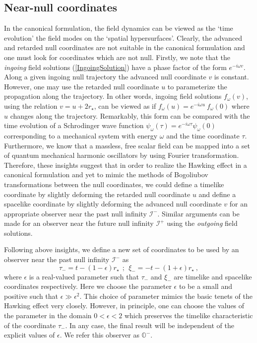 \documentclass[aps,12pt,showpacs]{revtex4-2}
\def\rstar{r_{\star}}
\def\scriplus{\mathscr{I}^{+}}
\def\scriminus{\mathscr{I}^{-}}
\def\observerminus{\mathbb{O}^{-}}
\begin{document}
\subsection{Near-null coordinates}


In the canonical formulation, the field dynamics can be viewed as the `time 
evolution' the field modes on the `spatial hypersurfaces'. Clearly, the advanced 
and retarded null coordinates are not suitable in the canonical formulation and 
one must look for coordinates which are not null. Firstly, we note that the 
\emph{ingoing} field solutions (\ref{IngoingSolution}) have a phase factor of 
the form $e^{-i\omega v}$. Along a given ingoing null trajectory the advanced 
null coordinate $v$ is constant. However, one may use the retarded null 
coordinate $u$ to parameterize the propagation along the trajectory. In other 
words, ingoing field solutions ${f}_{\omega}(v)$, using the relation 
$v=u+2\rstar$, can be viewed as if ${f}_{\omega}(u) = e^{-i\omega u } 
~{f}_{\omega}(0)$ where $u$ changes along the trajectory. Remarkably, this form 
can be compared with the time evolution of a Schrodinger wave function 
$\psi_{\omega}(\tau) = e^{-i\omega\tau}\psi_{\omega}(0)$ corresponding to a 
mechanical system with energy $\omega$ and the time coordinate $\tau$. 
Furthermore, we know that a massless, free scalar field can be mapped into a set 
of quantum mechanical harmonic oscillators by using Fourier transformation. 
Therefore, these insights suggest that in order to realize the Hawking effect in 
a canonical formulation and yet to mimic the methods of Bogoliubov 
transformations between the null coordinates, we could define a timelike 
coordinate by slightly deforming the retarded null coordinate $u$ and define a  
spacelike coordinate by slightly deforming the advanced null coordinate $v$ for 
an appropriate observer near the past null infinity $\scriminus$. Similar 
arguments can be made for an observer near the future null infinity $\scriplus$ 
using the \emph{outgoing} field solutions.


Following above insights, we define a new set of coordinates to be used by an 
observer near the past null infinity $\scriminus$ as
%
\begin{equation}\label{NearNullCoordinatesMinus}
\tau_{-} = t - (1-\epsilon)\rstar ~~;~~ \xi_{-} = -t - (1+\epsilon)\rstar  ~,
\end{equation}
%
where $\epsilon$ is a real-valued parameter such that $\tau_{-}$ and $\xi_{-}$ 
are timelike and spacelike coordinates respectively. Here we choose the 
parameter $\epsilon$ to be a small and positive such that $\epsilon \gg 
\epsilon^2$. This choice of parameter mimics the basic tenets of the Hawking 
effect very closely. However, in principle, one can choose the values of the 
parameter in the domain $0<\epsilon<2$ which preserves the timelike 
characteristic of the coordinate $\tau_{-}$. In any case, the final result will 
be independent of the explicit values of $\epsilon$. We refer this observer as 
$\observerminus$. 
\end{document}
